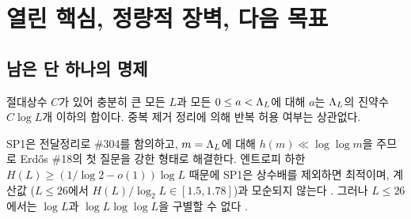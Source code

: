 \section{열린 핵심, 정량적 장벽, 다음 목표}\label{LEAD:opencore}

\subsection{남은 단 하나의 명제}
\begin{conjecture}[SP1]\label{LEAD:conj-SP1}
\OPEN{} 절대상수 $C$가 있어 충분히 큰 모든 $L$과 모든 $0\le a<\Lambda_L$에 대해 $a$는 $\Lambda_L$의 진약수 $C\log L$개 이하의 합이다. 중복 제거 정리에 의해 반복 허용 여부는 상관없다.
\end{conjecture}
SP1은 전달정리로 \#304를 함의하고, $m=\Lambda_L$에 대해 $h(m)\ll\log\log m$을 주므로 Erdős \#18의 첫 질문을 강한 형태로 해결한다. 엔트로피 하한 $H(L)\ge(1/\log2-o(1))\log L$ 때문에 SP1은 상수배를 제외하면 최적이며, 계산값 ($L\le26$에서 $H(L)/\log_2L\in[1.5,1.78]$)과 모순되지 않는다 \NUMERIC{}. 그러나 $L\le26$에서는 $\log L$과 $\log L\log\log L$을 구별할 수 없다 \HEUR{}.

